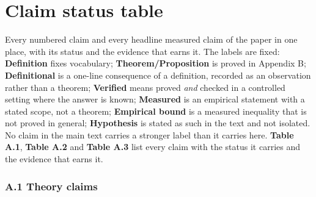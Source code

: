 \section{Claim status table}

Every numbered claim and every headline measured claim of the paper in one place, with its status and the evidence that earns it. The labels are fixed: \textbf{Definition} fixes vocabulary; \textbf{Theorem/Proposition} is proved in Appendix B; \textbf{Definitional} is a one-line consequence of a definition, recorded as an observation rather than a theorem; \textbf{Verified} means proved \textit{and} checked in a controlled setting where the answer is known; \textbf{Measured} is an empirical statement with a stated scope, not a theorem; \textbf{Empirical bound} is a measured inequality that is not proved in general; \textbf{Hypothesis} is stated as such in the text and not isolated. No claim in the main text carries a stronger label than it carries here. \textbf{Table A.1}, \textbf{Table A.2} and \textbf{Table A.3} list every claim with the status it carries and the evidence that earns it.

\subsubsection*{A.1 Theory claims}


